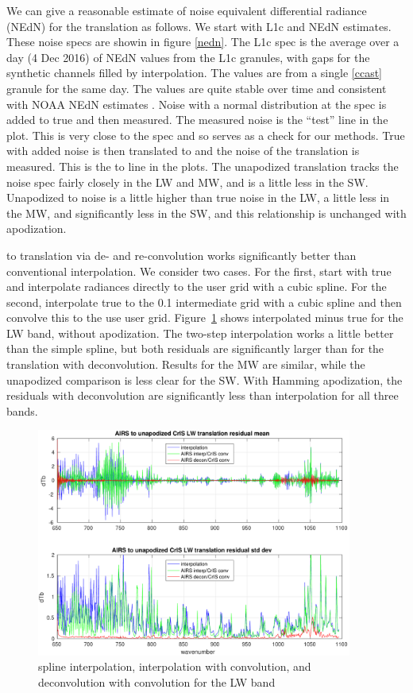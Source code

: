 \documentclass[11pt]{article}
\begin{document}
We can give a reasonable estimate of noise equivalent differential
radiance (NEdN) for the translation as follows.  We start with
{\airs} L1c and {\cris} NEdN estimates.  These noise specs are
showin in figure \ref{nedn}.  The L1c spec is the average over a day
(4 Dec 2016) of NEdN values from the L1c granules, with gaps for the
synthetic channels filled by interpolation.  The {\cris} values are
from a single {\ccast} \ref{ccast} granule for the same day.  The
{\ccast} values are quite stable over time and consistent with NOAA
{\cris} NEdN estimates \cite{zav2013}.  Noise with a normal
distribution at the {\airs} spec is added to true {\airs} and then
measured.  The measured {\airs} noise is the ``test'' line in the
plot.  This is very close to the spec and so serves as a check for
our methods.  True {\airs} with added noise is then translated to
{\cris} and the noise of the translation is measured.  This is the
{\airs} to {\cris} line in the plots.  The unapodized translation
tracks the {\airs} noise spec fairly closely in the LW and MW, and
is a little less in the SW.  Unapodized {\airs} to {\cris} noise is
a little higher than true {\cris} noise in the LW, a little less in
the MW, and significantly less in the SW, and this relationship is
unchanged with apodization.

{\airs} to {\cris} translation via de- and re-convolution works
significantly better than conventional interpolation.  We consider
two cases.  For the first, start with true {\airs} and interpolate
radiances directly to the {\cris} user grid with a cubic spline.
For the second, interpolate true {\airs} to the 0.1 {\wn}
intermediate grid with a cubic spline and then convolve this to the
use {\cris} user grid.  Figure~\ref{intpLW} shows interpolated
{\cris} minus true {\cris} for the LW band, without apodization.
The two-step interpolation works a little better than the simple
spline, but both residuals are significantly larger than for the
translation with deconvolution.  Results for the MW are similar,
while the unapodized comparison is less clear for the SW.  With
Hamming apodization, the residuals with deconvolution are
significantly less than interpolation for all three bands.

\begin{figure} %
  \centering
  \includegraphics[height=7.5cm]{figures/a2cris_interp_LW.pdf}
  \caption{spline interpolation, interpolation with convolution, 
    and deconvolution with convolution for the {\cris} LW band}
  \label{intpLW}
\end{figure}
\end{document}
